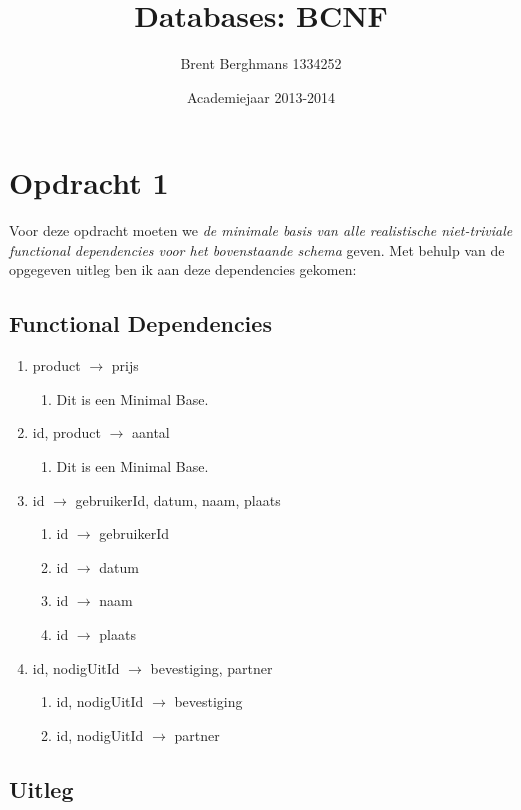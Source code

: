 \documentclass[a4paper]{article}
\title{Databases: BCNF}
\author{Brent Berghmans 1334252}
\date{Academiejaar 2013-2014}
\begin{document}
\maketitle

\section{Opdracht 1}
Voor deze opdracht moeten we \emph{de minimale basis van alle realistische niet-triviale functional dependencies voor het bovenstaande schema} geven. Met behulp van de opgegeven uitleg ben ik aan deze dependencies gekomen:

\subsection{Functional Dependencies}
\begin{enumerate}
  \item product $\rightarrow$ prijs \begin{enumerate}
  	\item Dit is een Minimal Base.
  	\end{enumerate}
  \item id, product $\rightarrow$ aantal \begin{enumerate}
  	\item Dit is een Minimal Base.
  	\end{enumerate}
  \item id $\rightarrow$ gebruikerId, datum, naam, plaats \begin{enumerate}
  	\item id $\rightarrow$ gebruikerId
  	\item id $\rightarrow$ datum
  	\item id $\rightarrow$ naam
  	\item id $\rightarrow$ plaats
  	\end{enumerate}
  \item id, nodigUitId $\rightarrow$ bevestiging, partner \begin{enumerate}
  	\item id, nodigUitId $\rightarrow$ bevestiging
  	\item id, nodigUitId $\rightarrow$ partner
  	\end{enumerate}
\end{enumerate}

\subsection{Uitleg}
\end{document}
